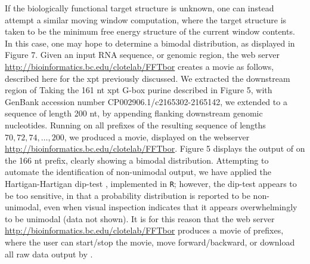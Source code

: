 If the biologically functional target structure is unknown, one can
instead attempt a similar moving window computation, where the target
structure is taken to be the minimum free energy structure of the
current window contents. In this case, one may hope to determine a
bimodal distribution, as displayed in Figure 7.
Given an input RNA sequence, or genomic region, the
web server \url{http://bioinformatics.bc.edu/clotelab/FFTbor}
creates a movie as follows, described here for the xpt \rb
previously discussed.  We extracted the downstream region of
Taking the
161 nt xpt G-box purine \rb described in Figure 5,
with GenBank accession number CP002906.1/c2165302-2165142, we extended
to a sequence of length 200 nt, by appending flanking
downstream genomic nucleotides.  Running \fftbor on all
prefixes of the resulting sequence of lengths
$70,72,74,\ldots,200$, we produced a movie, displayed on the webserver
\url{http://bioinformatics.bc.edu/clotelab/FFTbor}.
Figure 5 displays the output of \fftbor on the
166 nt prefix, clearly showing a bimodal distribution. Attempting to
automate the identification of non-unimodal \fftbor output, we have
applied the Hartigan-Hartigan dip-test \citep{hartiganDipTest},
implemented in {\tt R}; however,
the dip-test appears to be too sensitive, in that a probability distribution
is reported to be non-unimodal, even when visual inspection indicates that
it appears overwhelmingly to be unimodal (data not shown). It is for this
reason that the web server
\url{http://bioinformatics.bc.edu/clotelab/FFTbor} produces a movie of
prefixes, where the user can start/stop the movie,
move forward/backward, or download all raw data output by \fftbor.


